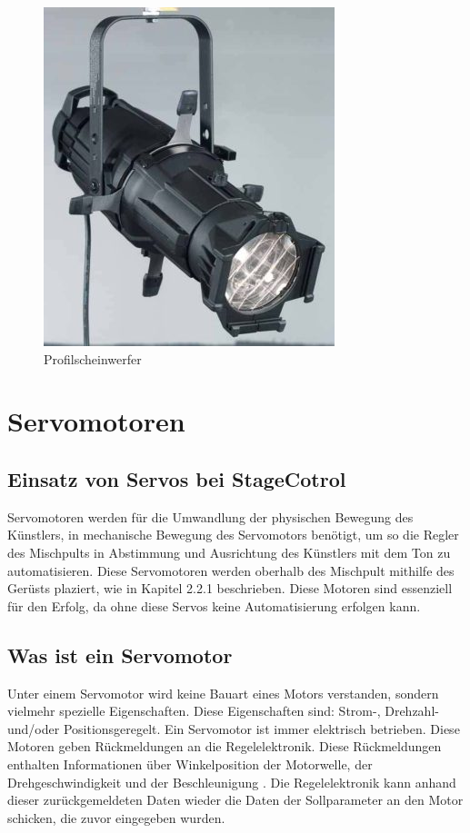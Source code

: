\begin{figure}[H]
	\centering
	\includegraphics[width=0.7\linewidth]{images/Profilscheinwerfer.jpg}
	\caption[Profilscheinwerfer]{Profilscheinwerfer}
	\label{fig:Profilscheinwerfer}
\end{figure}

\section{Servomotoren}
\subsection{Einsatz von Servos bei StageCotrol}
Servomotoren werden für die Umwandlung der physischen Bewegung des Künstlers, in mechanische Bewegung des Servomotors benötigt, um so die Regler des Mischpults in Abstimmung und Ausrichtung des Künstlers mit dem Ton zu automatisieren. Diese Servomotoren werden oberhalb des Mischpult mithilfe des Gerüsts plaziert, wie in Kapitel 2.2.1 beschrieben. Diese Motoren sind essenziell für den Erfolg, da ohne diese Servos keine Automatisierung erfolgen kann.

\subsection{Was ist ein Servomotor}
Unter einem Servomotor wird keine Bauart eines Motors verstanden, sondern vielmehr spezielle Eigenschaften. Diese Eigenschaften sind: Strom-, Drehzahl- und/oder Positionsgeregelt. Ein Servomotor ist immer elektrisch betrieben. Diese Motoren geben Rückmeldungen an die Regelelektronik. Diese Rückmeldungen enthalten Informationen über Winkelposition der Motorwelle, der Drehgeschwindigkeit und der Beschleunigung \textcite{ServomotorInfo}. Die Regelelektronik kann anhand dieser zurückgemeldeten Daten wieder die Daten der Sollparameter an den Motor schicken, die zuvor eingegeben wurden. \\



